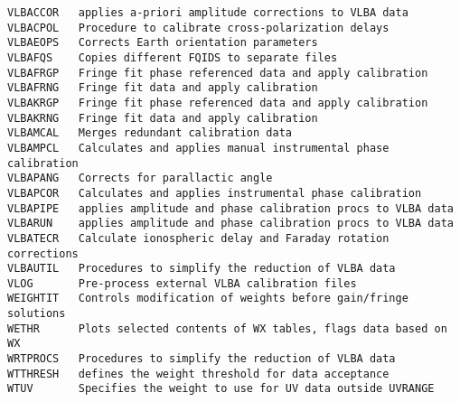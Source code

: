 \begin{verbatim}
VLBACCOR   applies a-priori amplitude corrections to VLBA data
VLBACPOL   Procedure to calibrate cross-polarization delays
VLBAEOPS   Corrects Earth orientation parameters
VLBAFQS    Copies different FQIDS to separate files
VLBAFRGP   Fringe fit phase referenced data and apply calibration
VLBAFRNG   Fringe fit data and apply calibration
VLBAKRGP   Fringe fit phase referenced data and apply calibration
VLBAKRNG   Fringe fit data and apply calibration
VLBAMCAL   Merges redundant calibration data
VLBAMPCL   Calculates and applies manual instrumental phase calibration
VLBAPANG   Corrects for parallactic angle
VLBAPCOR   Calculates and applies instrumental phase calibration
VLBAPIPE   applies amplitude and phase calibration procs to VLBA data
VLBARUN    applies amplitude and phase calibration procs to VLBA data
VLBATECR   Calculate ionospheric delay and Faraday rotation corrections
VLBAUTIL   Procedures to simplify the reduction of VLBA data
VLOG       Pre-process external VLBA calibration files
WEIGHTIT   Controls modification of weights before gain/fringe solutions
WETHR      Plots selected contents of WX tables, flags data based on WX
WRTPROCS   Procedures to simplify the reduction of VLBA data
WTTHRESH   defines the weight threshold for data acceptance
WTUV       Specifies the weight to use for UV data outside UVRANGE
\end{verbatim}\eve


